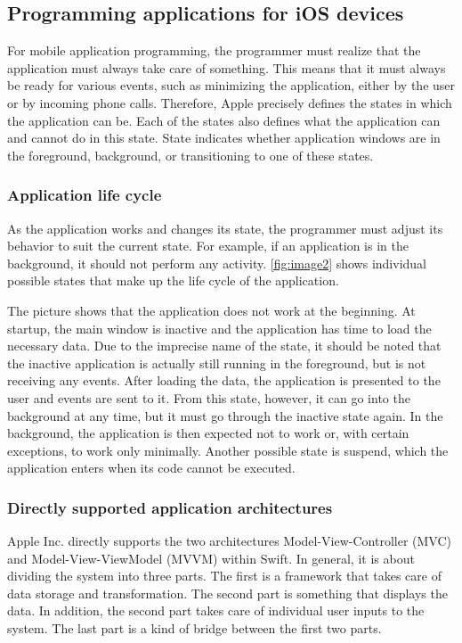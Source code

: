 \documentclass[
  language=english,
  figures=false,
  sourcecodes,
  index
]{kidiplom}
\begin{document}
\subsection{Programming applications for iOS devices}
For mobile application programming, the programmer must realize that the application must always take care of something. This means that it must always be ready for various events, such as minimizing the application, either by the user or by incoming phone calls. Therefore, Apple precisely defines the states in which the application can be. Each of the states also defines what the application can and cannot do in this state. State indicates whether application windows are in the foreground, background, or transitioning to one of these states.

\subsubsection{Application life cycle}
As the application works and changes its state, the programmer must adjust its behavior to suit the current state. For example, if an application is in the background, it should not perform any activity. \ref{fig:image2} shows individual possible states that make up the life cycle of the application\cite{bib4}.


The picture shows that the application does not work at the beginning. At startup, the main window is inactive and the application has time to load the necessary data. Due to the imprecise name of the state, it should be noted that the inactive application is actually still running in the foreground, but is not receiving any events. After loading the data, the application is presented to the user and events are sent to it. From this state, however, it can go into the background at any time, but it must go through the inactive state again. In the background, the application is then expected not to work or, with certain exceptions, to work only minimally. Another possible state is suspend, which the application enters when its code cannot be executed.

\subsubsection{Directly supported application architectures}
Apple Inc. directly supports the two architectures Model-View-Controller (MVC) and Model-View-ViewModel (MVVM) within Swift. In general, it is about dividing the system into three parts. The first is a framework that takes care of data storage and transformation. The second part is something that displays the data. In addition, the second part takes care of individual user inputs to the system. The last part is a kind of bridge between the first two parts.
\end{document}
